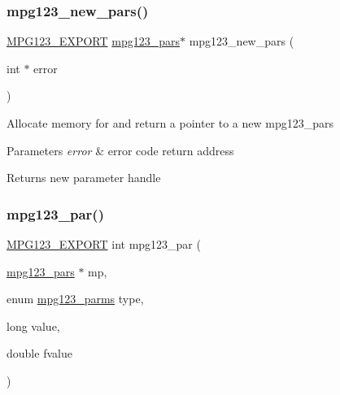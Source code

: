 \subsubsection{\texorpdfstring{mpg123\_new\_pars()}{mpg123\_new\_pars()}}
{\footnotesize\ttfamily \mbox{\hyperlink{mpg123_8h_a2ba98cfba3f760879df70e755b2a61cc}{M\+P\+G123\+\_\+\+E\+X\+P\+O\+RT}} \mbox{\hyperlink{group__mpg123__advpar_ga3983578625af3bb6dc7e3b74d0cab4aa}{mpg123\+\_\+pars}}$\ast$ mpg123\+\_\+new\+\_\+pars (\begin{DoxyParamCaption}\item[{int $\ast$}]{error }\end{DoxyParamCaption})}

Allocate memory for and return a pointer to a new mpg123\+\_\+pars 
\begin{DoxyParams}{Parameters}
{\em error} & error code return address \\
\hline
\end{DoxyParams}
\begin{DoxyReturn}{Returns}
new parameter handle 
\end{DoxyReturn}
\mbox{\label{group__mpg123__advpar_gacf5f968dde49b648327ef601d9ff0367}} 
\subsubsection{\texorpdfstring{mpg123\_par()}{mpg123\_par()}}
{\footnotesize\ttfamily \mbox{\hyperlink{mpg123_8h_a2ba98cfba3f760879df70e755b2a61cc}{M\+P\+G123\+\_\+\+E\+X\+P\+O\+RT}} int mpg123\+\_\+par (\begin{DoxyParamCaption}\item[{\mbox{\hyperlink{group__mpg123__advpar_ga3983578625af3bb6dc7e3b74d0cab4aa}{mpg123\+\_\+pars}} $\ast$}]{mp,  }\item[{enum \mbox{\hyperlink{group__mpg123__init_ga73a8ff3363028b89afc72b3ea032b9cb}{mpg123\+\_\+parms}}}]{type,  }\item[{long}]{value,  }\item[{double}]{fvalue }\end{DoxyParamCaption})}

